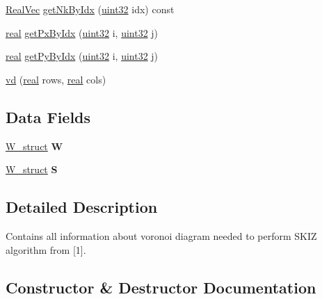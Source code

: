\begin{DoxyCompactItemize}
\item 
\mbox{\hyperlink{typedefs_8cpp_a84b6d9a0fbb45e01ad4a3aa5667f2992}{Real\+Vec}} \mbox{\hyperlink{classvd_a4d058d2d1d675a741a83776c95b2acfb}{get\+Nk\+By\+Idx}} (\mbox{\hyperlink{typedefs_8cpp_a8ad23e2333787a214e20a58a284a5a60}{uint32}} idx) const
\item 
\mbox{\hyperlink{typedefs_8cpp_a58a0c7cf2501f4492da833421be92547}{real}} \mbox{\hyperlink{classvd_aa80f528bca24356805f2a31234e67ac1}{get\+Px\+By\+Idx}} (\mbox{\hyperlink{typedefs_8cpp_a8ad23e2333787a214e20a58a284a5a60}{uint32}} i, \mbox{\hyperlink{typedefs_8cpp_a8ad23e2333787a214e20a58a284a5a60}{uint32}} j)
\item 
\mbox{\hyperlink{typedefs_8cpp_a58a0c7cf2501f4492da833421be92547}{real}} \mbox{\hyperlink{classvd_ae6c4ff0f49e07803f5dd13545f6e8f3f}{get\+Py\+By\+Idx}} (\mbox{\hyperlink{typedefs_8cpp_a8ad23e2333787a214e20a58a284a5a60}{uint32}} i, \mbox{\hyperlink{typedefs_8cpp_a8ad23e2333787a214e20a58a284a5a60}{uint32}} j)
\item 
\mbox{\hyperlink{classvd_a765c16ee377a2a0f9651d555edd3a158}{vd}} (\mbox{\hyperlink{typedefs_8cpp_a58a0c7cf2501f4492da833421be92547}{real}} rows, \mbox{\hyperlink{typedefs_8cpp_a58a0c7cf2501f4492da833421be92547}{real}} cols)
\end{DoxyCompactItemize}
\subsection*{Data Fields}
\begin{DoxyCompactItemize}
\item 
\mbox{\label{classvd_ab23d33e6c11c46ad3302a874a4726542}} 
\mbox{\hyperlink{structW__struct}{W\+\_\+struct}} {\bfseries W}
\item 
\mbox{\label{classvd_a960c80ec5b52938f999f528a5e3cccf1}} 
\mbox{\hyperlink{structW__struct}{W\+\_\+struct}} {\bfseries S}
\end{DoxyCompactItemize}


\subsection{Detailed Description}
Contains all information about voronoi diagram needed to perform S\+K\+IZ algorithm from \mbox{[}1\mbox{]}. 

\subsection{Constructor \& Destructor Documentation}
\mbox{\label{classvd_a765c16ee377a2a0f9651d555edd3a158}} 
